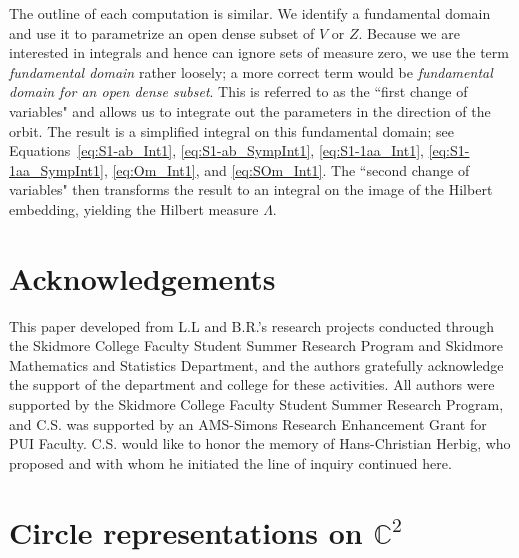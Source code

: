 \documentclass[twoside]{amsart}
\theoremstyle{definition}
\theoremstyle{remark}
\numberwithin{equation}{section}
\newcommand{\C}{\mathbb{C}}
\begin{document}
The outline of each computation is similar. We identify a fundamental domain and use it to parametrize an open dense subset of $V$ or $Z$.
Because we are interested in integrals and hence can ignore sets of measure zero, we use the term \emph{fundamental domain} rather loosely;
a more correct term would be \emph{fundamental domain for an open dense subset}.
This is referred to as the ``first change of variables" and allows us to integrate out the parameters in the direction of the orbit.
The result is a simplified integral on this fundamental domain; see
Equations~\eqref{eq:S1-ab_Int1}, \eqref{eq:S1-ab_SympInt1}, \eqref{eq:S1-1aa_Int1}, \eqref{eq:S1-1aa_SympInt1},
\eqref{eq:Om_Int1}, and \eqref{eq:SOm_Int1}. The ``second change of variables" then transforms the result to an integral on the
image of the Hilbert embedding, yielding the Hilbert measure $\Lambda$.





\section*{Acknowledgements}

This paper developed from L.L and B.R.'s research projects conducted through the Skidmore College Faculty Student Summer Research Program
and Skidmore Mathematics and Statistics Department, and the authors gratefully acknowledge the support of the department and college for these activities.
All authors were supported by the Skidmore College Faculty Student Summer Research Program, and
C.S. was supported by an AMS-Simons Research Enhancement Grant for PUI Faculty.
C.S. would like to honor the memory of Hans-Christian Herbig, who proposed and with whom he initiated the line of inquiry continued here.


\section{Circle representations on $\C^2$}
\label{sec:S1-ab}
\end{document}
